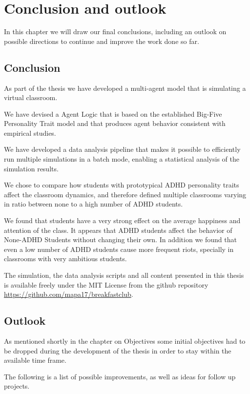 \chapter{Conclusion and outlook}
In this chapter we will draw our final conclusions, including an outlook on
possible directions to continue and improve the work done so far.

\section{Conclusion}
As part of the thesis we have developed a multi-agent model that is simulating a virtual classroom.

We have devised a Agent Logic that is based on the established Big-Five Personality
Trait model and that produces agent behavior consistent with empirical studies.

We have developed a data analysis pipeline that makes it possible to efficiently
run multiple simulations in a batch mode, enabling a statistical analysis of the
simulation results.

We chose to compare how students with prototypical ADHD personality traits affect
the classroom dynamics, and therefore defined multiple classrooms varying in 
ratio between none to a high number of ADHD students.

We found that students have a very strong effect on the average happiness and attention
of the class. It appears that ADHD students affect the behavior of None-ADHD Students
without changing their own. In addition we found that even a low number of
ADHD students cause more frequent riots, specially in classrooms with very
ambitious students.

The simulation, the data analysis scripts and all content presented in this
thesis is available freely under the MIT License from the github repository \\
\href{https://github.com/mapa17/breakfastclub}{https://github.com/mapa17/breakfastclub}.

\section{Outlook}
As mentioned shortly in the chapter on Objectives some initial objectives had to
be dropped during the development of the thesis in order to stay within the available
time frame.

The following is a list of possible improvements, as well as ideas for follow up projects.

